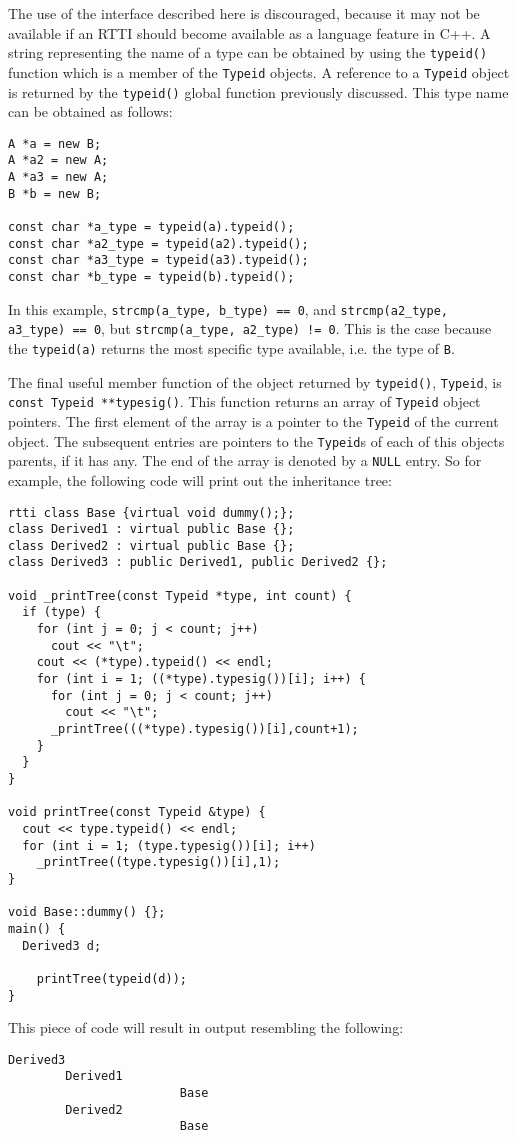 The use of the interface described here is discouraged, because it may not
be available if an RTTI should become available as a language feature in C++.
A string representing the name of a type can be obtained by using the 
{\tt typeid()} function which is a member of the {\tt Typeid} objects. A 
reference to a {\tt Typeid} object is returned by the {\tt typeid()} global
function previously discussed. This type name can be obtained as follows:
\begin{verbatim}
A *a = new B;
A *a2 = new A;
A *a3 = new A;
B *b = new B;

const char *a_type = typeid(a).typeid();
const char *a2_type = typeid(a2).typeid();
const char *a3_type = typeid(a3).typeid();
const char *b_type = typeid(b).typeid();
\end{verbatim}
\noindent
In this example, {\tt strcmp(a\_type, b\_type) == 0}, and 
{\tt strcmp(a2\_type, a3\_type) == 0}, but {\tt strcmp(a\_type, a2\_type) != 0}.
This is the case because the {\tt typeid(a)} returns the most specific type 
available, i.e. the type of {\tt B}.

The final useful member function of the object returned by {\tt typeid()},
{\tt Typeid}, is {\tt const Typeid **typesig()}. This function returns an 
array of {\tt Typeid} object pointers. The first element of the array is a 
pointer to the {\tt Typeid} of the current object. The subsequent entries
are pointers to the {\tt Typeid}s of each of this objects parents, if it has
any. The end of the array is denoted by a {\tt NULL} entry. So for 
example, the following code will print out the inheritance tree:
\begin{verbatim}
rtti class Base {virtual void dummy();};
class Derived1 : virtual public Base {};
class Derived2 : virtual public Base {};
class Derived3 : public Derived1, public Derived2 {};

void _printTree(const Typeid *type, int count) {
  if (type) {
    for (int j = 0; j < count; j++)
      cout << "\t";
    cout << (*type).typeid() << endl;
    for (int i = 1; ((*type).typesig())[i]; i++) {
      for (int j = 0; j < count; j++)
        cout << "\t";
      _printTree(((*type).typesig())[i],count+1);
    }
  }
}

void printTree(const Typeid &type) {
  cout << type.typeid() << endl;
  for (int i = 1; (type.typesig())[i]; i++)
    _printTree((type.typesig())[i],1);
}

void Base::dummy() {};
main() {
  Derived3 d;

    printTree(typeid(d));
}
\end{verbatim}
\noindent
This piece of code will result in output resembling the following:
\begin{verbatim}
Derived3
        Derived1
                        Base
        Derived2
                        Base
\end{verbatim}
